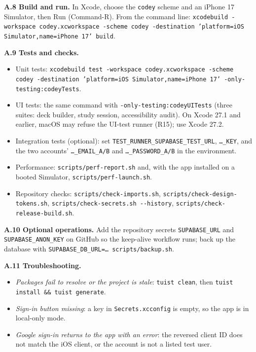\documentclass[12pt,letterpaper]{article}
\begin{document}
\textbf{A.8 Build and run.} In Xcode, choose the \texttt{codey} scheme and an iPhone 17
Simulator, then Run (Command-R). From the command line:
\texttt{xcodebuild -workspace codey.xcworkspace -scheme codey -destination
'platform=iOS Simulator,name=iPhone 17' build}.

\textbf{A.9 Tests and checks.}
\begin{itemize}
  \item Unit tests: \texttt{xcodebuild test -workspace codey.xcworkspace -scheme codey
        -destination 'platform=iOS Simulator,name=iPhone 17'
        -only-testing:codeyTests}.
  \item UI tests: the same command with \texttt{-only-testing:codeyUITests} (three
        suites: deck builder, study session, accessibility audit). On Xcode 27.1 and
        earlier, macOS may refuse the UI-test runner (R15); use Xcode 27.2.
  \item Integration tests (optional): set \texttt{TEST\_RUNNER\_SUPABASE\_TEST\_URL},
        \texttt{\ldots\_KEY}, and the two accounts' \texttt{\ldots\_EMAIL\_A/B} and
        \texttt{\ldots\_PASSWORD\_A/B} in the environment.
  \item Performance: \texttt{scripts/perf-report.sh} and, with the app installed on a
        booted Simulator, \texttt{scripts/perf-launch.sh}.
  \item Repository checks: \texttt{scripts/check-imports.sh},
        \texttt{scripts/check-design-tokens.sh},
        \texttt{scripts/check-secrets.sh -{}-history},
        \texttt{scripts/check-release-build.sh}.
\end{itemize}

\textbf{A.10 Optional operations.} Add the repository secrets \texttt{SUPABASE\_URL}
and \texttt{SUPABASE\_ANON\_KEY} on GitHub so the keep-alive workflow runs; back up
the database with \texttt{SUPABASE\_DB\_URL=\ldots{} scripts/backup.sh}.

\textbf{A.11 Troubleshooting.}
\begin{itemize}
  \item \emph{Packages fail to resolve or the project is stale}: \texttt{tuist clean},
        then \texttt{tuist install \&\& tuist generate}.
  \item \emph{Sign-in button missing}: a key in \texttt{Secrets.xcconfig} is empty, so
        the app is in local-only mode.
  \item \emph{Google sign-in returns to the app with an error}: the reversed client ID
        does not match the iOS client, or the account is not a listed test user.
\end{itemize}
\end{document}
